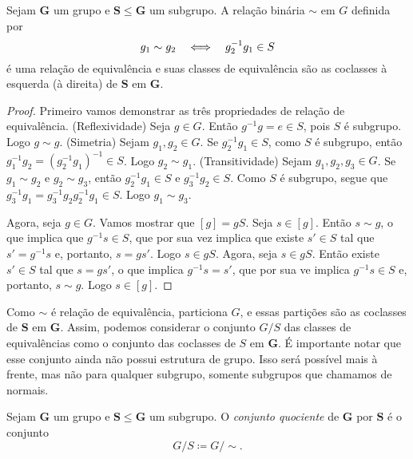 \begin{prop}
Sejam $\bm G$ um grupo e $\bm S \leq \bm G$ um subgrupo. A relação binária $\sim$ em $G$ definida por
	\begin{equation*}
	g_1 \sim g_2 \quad \Longleftrightarrow \quad g_2^{-1}g_1 \in S
	\end{equation*}
é uma relação de equivalência e suas classes de equivalência são as coclasses à esquerda (à direita) de $\bm S$ em $\bm G$.
\end{prop}
\begin{proof}
Primeiro vamos demonstrar as três propriedades de relação de equivalência. (Reflexividade) Seja $g \in G$. Então $g^{-1}g=e \in S$, pois $S$ é subgrupo. Logo $g \sim g$. (Simetria) Sejam $g_1,g_2 \in G$. Se $g_2^{-1}g_1 \in S$, como $S$ é subgrupo, então $g_1^{-1}g_2=(g_2^{-1}g_1)^{-1} \in S$. Logo $g_2 \sim g_1$. (Transitividade) Sejam $g_1,g_2,g_3 \in G$. Se $g_1 \sim g_2$ e $g_2 \sim g_3$, então $g_2^{-1}g_1 \in S$ e $g_3^{-1}g_2 \in S$. Como $S$ é subgrupo, segue que $g_3^{-1}g_1=g_3^{-1}g_2g_2^{-1}g_1 \in S$. Logo $g_1 \sim g_3$.

Agora, seja $g \in G$. Vamos mostrar que $[g]=gS$. Seja $s \in [g]$. Então $s \sim g$, o que implica que $g^{-1}s \in S$, que por sua vez implica que existe $s' \in S$ tal que $s'=g^{-1}s$ e, portanto, $s=gs'$. Logo $s \in gS$. Agora, seja $s \in gS$. Então existe $s' \in S$ tal que $s=gs'$, o que implica $g^{-1}s=s'$, que por sua ve implica $g^{-1}s \in S$ e, portanto, $s \sim g$. Logo $s \in [g]$.
\end{proof}

Como $\sim$ é relação de equivalência, particiona $G$, e essas partições são as coclasses de $\bm S$ em $\bm G$. Assim, podemos considerar o conjunto $G/S$ das classes de equivalências como o conjunto das coclasses de $S$ em $\bm G$. É importante notar que esse conjunto ainda não possui estrutura de grupo. Isso será possível mais à frente, mas não para qualquer subgrupo, somente subgrupos que chamamos de normais.

\begin{defi}
Sejam $\bm G$ um grupo e $\bm S \leq \bm G$ um subgrupo. O \emph{conjunto quociente} de $\bm G$ por $\bm S$ é o conjunto
	\begin{equation*}
	G/S \coloneqq G/\sim.
	\end{equation*}
\end{defi}

